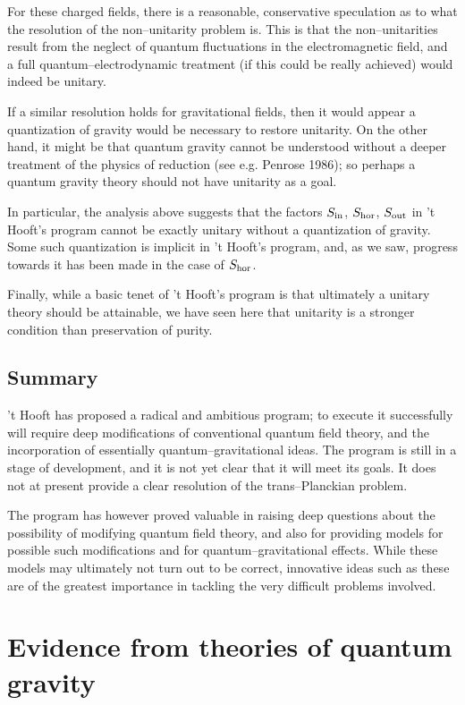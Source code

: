 For these charged fields, there
is a reasonable, conservative
speculation as to what the resolution of the non--unitarity problem is.
This is that the
non--unitarities result from the neglect of quantum fluctuations in
the electromagnetic field, and a full quantum--electrodynamic
treatment (if this could be really achieved) would indeed be unitary.

If a similar resolution holds for gravitational fields, then it would
appear a quantization of gravity would be necessary to restore
unitarity.  On the other hand, it might be that quantum gravity cannot
be understood without a deeper treatment of the physics of reduction
(see e.g. Penrose 1986); so perhaps a quantum gravity theory should
not have unitarity as a goal.

In particular, the analysis above suggests that the factors $S_{\rm
in}$, $S_{\rm hor}$, $S_{\rm out}$ in 't Hooft's program
cannot be exactly unitary without a quantization of gravity.  Some
such quantization is implicit in 't Hooft's program, and, as we saw,
progress towards it has been made in the case of $S_{\rm hor}$.

Finally, while a basic tenet of 't Hooft's program is that ultimately a
unitary theory should be attainable, we have seen here that unitarity
is a stronger condition than preservation of purity.  



\subsection{Summary}

't Hooft has proposed a radical and ambitious program; to execute it
successfully will require deep modifications of conventional quantum
field theory, and the incorporation of essentially
quantum--gravitational ideas.  The program is still in a stage of
development, and it is not yet clear that it will meet its goals.
It does not at present provide a clear resolution of the
trans--Planckian problem.

The program has however proved valuable in raising deep questions
about the possibility of modifying quantum field theory, and also for
providing models for possible such modifications and for
quantum--gravitational effects.  While these models may ultimately not
turn out to be correct, innovative ideas such as these are
of the greatest importance in tackling the very difficult problems involved.

\section{Evidence from theories of quantum gravity}


